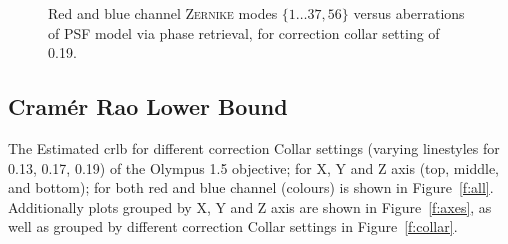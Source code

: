 \documentclass[11pt, a4paper, oneside, twocolumn]{report}
\begin{document}
\begin{figure}[!t]
  \caption{ Red and blue channel \textsc{Zernike} modes $\{1\dots37,56\}$
    versus aberrations of PSF model via phase retrieval, for
    correction collar setting of 0.19.}
  \label{f:zern019}
\end{figure}


\clearpage\subsection{Cram\'er Rao Lower Bound}\label{s:r:crlb}

The Estimated \acrfull{crlb} for different correction Collar settings
(varying linestyles for 0.13, 0.17, 0.19) of the Olympus \SI{1.5}{\NA}
objective; for X, Y and Z axis (top, middle, and bottom); for both red
and blue channel (colours) is shown in
Figure~\ref{f:all}.\\

Additionally plots grouped by X, Y and Z axis are shown in
Figure~\ref{f:axes}, as well as grouped by different correction Collar
settings in Figure~\ref{f:collar}.\\
\end{document}
